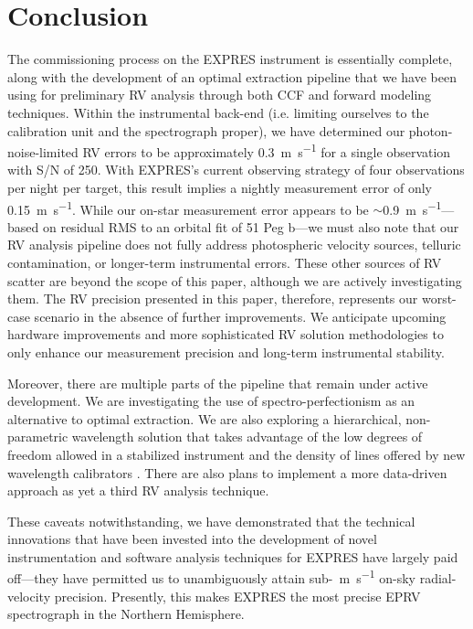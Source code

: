 \section{Conclusion}
\label{pipeline:conclusion}

The commissioning process on the EXPRES instrument is essentially complete, along with the development of an optimal extraction pipeline that we have been using for preliminary RV analysis through both CCF and forward modeling techniques. Within the instrumental back-end (i.e. limiting ourselves to the calibration unit and the spectrograph proper), we have determined our photon-noise-limited RV errors to be approximately 0.3~\si{\meter\per\second} for a single observation with S/N of 250. With EXPRES's current observing strategy of four observations per night per target, this result implies a nightly measurement error of only 0.15~\si{\meter\per\second}. While our on-star measurement error appears to be $\sim$0.9~\si{\meter\per\second}---based on residual RMS to an orbital fit of 51 Peg b---we must also note that our RV analysis pipeline does not fully address photospheric velocity sources, telluric contamination, or longer-term instrumental errors. These other sources of RV scatter are beyond the scope of this paper, although we are actively investigating them. The RV precision presented in this paper, therefore, represents our worst-case scenario in the absence of further improvements. We anticipate upcoming hardware improvements and more sophisticated RV solution methodologies to only enhance our measurement precision and long-term instrumental stability. 

Moreover, there are multiple parts of the pipeline that remain under active development. We are investigating the use of spectro-perfectionism \citep{bolton_spectro-perfectionism_2009, cornachione_full_2019} as an alternative to optimal extraction. We are also exploring a hierarchical, non-parametric wavelength solution that takes advantage of the low degrees of freedom allowed in a stabilized instrument and the density of lines offered by new wavelength calibrators \citep{zhao_excalibur_2020}. There are also plans to implement a more data-driven approach \citep[as in][with modifications to permit chromatic barycentric corrections]{bedell_wobble_2019} as yet a third RV analysis technique. 

These caveats notwithstanding, we have demonstrated that the technical innovations that have been invested into the development of novel instrumentation and software analysis techniques for EXPRES have largely paid off---they have permitted us to unambiguously attain sub-~\si{\meter\per\second} on-sky radial-velocity precision. Presently, this makes EXPRES the most precise EPRV spectrograph in the Northern Hemisphere.

